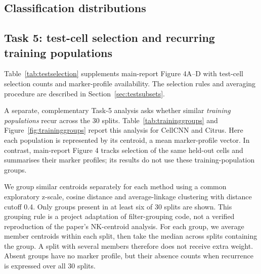 \documentclass[11pt,a4paper]{article}
\begin{document}
\subsection{Classification distributions}
\begin{table}[htb]\centering\small

\caption{Three-method benchmark on the 30 common splits: median [Q1, Q3]. AUC and AP are score-based, while BA uses the method's declared decision threshold.}
\end{table}
\begin{table}[htb]\centering\small

\caption{Means over the same 30 splits. Means and medians are deliberately reported separately.}
\end{table}
\begin{table}[htb]\centering\small

\caption{Additional CellCNN/SVM comparison over all 100 stored splits: median [Q1, Q3]. This is a separate comparison, not an extension of Citrus to 100 splits.}
\end{table}
\begin{table}[htb]\centering\footnotesize

\caption{Paired AUC differences on identical donor splits. Better/equal/worse counts describe the first method relative to the second. No independence-based significance test is inferred from these overlapping repeats.}
\end{table}

\newpage
\subsection{Task 5: test-cell selection and recurring training populations}
Table~\ref{tab:testselection} supplements main-report Figure 4A--D with test-cell selection counts and marker-profile availability. The selection rules and averaging procedure are described in Section~\ref{sec:testsubsets}.

A separate, complementary Task-5 analysis asks whether similar \emph{training populations} recur across the 30 splits. Table~\ref{tab:traininggroups} and Figure~\ref{fig:traininggroups} report this analysis for CellCNN and Citrus. Here each population is represented by its centroid, a mean marker-profile vector. In contrast, main-report Figure 4 tracks selection of the same held-out cells and summarises their marker profiles; its results do not use these training-population groups.

We group similar centroids separately for each method using a common exploratory z-scale, cosine distance and average-linkage clustering with distance cutoff 0.4. Only groups present in at least six of 30 splits are shown. This grouping rule is a project adaptation of filter-grouping code, not a verified reproduction of the paper's NK-centroid analysis. For each group, we average member centroids within each split, then take the median across splits containing the group. A split with several members therefore does not receive extra weight. Absent groups have no marker profile, but their absence counts when recurrence is expressed over all 30 splits.
\end{document}

